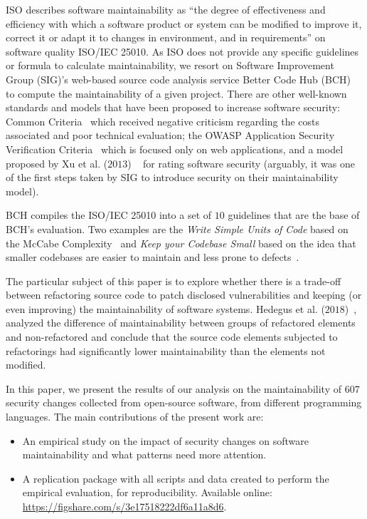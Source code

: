 \documentclass[10pt,conference]{IEEEtran}
\begin{document}
ISO describes software maintainability as ``the degree of effectiveness and
efficiency with which a software product or system can be modified to improve
it, correct it or adapt it to changes in environment, and in requirements'' on
software quality ISO/IEC 25010. As ISO does not provide any specific guidelines
or formula to calculate maintainability, we resort on Software Improvement
Group (SIG)'s web-based source code analysis service Better Code Hub
(BCH)~\cite{Visser:2016:OREILLY} to compute the maintainability of a given
project. There are other well-known standards and models that have been proposed
to increase software security: Common Criteria~\cite{common:2009} which received
negative criticism regarding the costs associated and poor technical evaluation;
the OWASP Application Security Verification Criteria~\cite{oswap:2009} which is
focused only on web applications, and a model proposed by Xu et al. ($2013$)
~\cite{6616351} for rating software security (arguably, it was one of the
first steps taken by SIG to introduce security on their maintainability model).

BCH compiles the ISO/IEC 25010 into a set of $10$ guidelines that are the
base of BCH's evaluation. Two examples are the \emph{Write Simple Units of Code}
based on the McCabe Complexity~\cite{1702388} and \emph{Keep your Codebase Small}
based on the idea that smaller codebases are easier to maintain and less prone to defects~\cite{Visser:2016:OREILLY}.

The particular subject of this paper is to explore whether there is a trade-off
between refactoring source code to patch disclosed vulnerabilities and keeping
(or even improving) the maintainability of software systems. Hedegus et al. ($2018$)~\cite{HEGEDUS2018313}, analyzed the difference of maintainability between
groups of refactored elements and non-refactored and conclude that the source
code elements subjected to refactorings had significantly lower maintainability
than the elements not modified.

In this paper, we present the results of our analysis on the maintainability of
$607$ security changes collected from open-source software, from different
programming languages. The main contributions of the present work are:

\begin{itemize}
	\item An empirical study on the impact of security changes on software
	maintainability and what patterns need more attention.
	\item A replication package with all scripts and data created to perform the
	empirical evaluation, for reproducibility. Available online:
  \url{https://figshare.com/s/3e17518222df6a11a8d6}.
\end{itemize}
\end{document}
